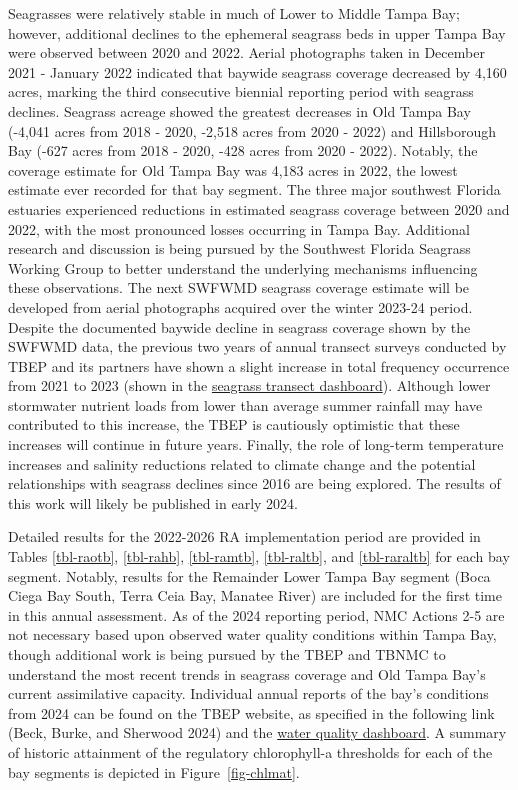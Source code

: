 \documentclass[
  letterpaper,
  DIV=11,
  numbers=noendperiod]{scrreport}
\begin{document}
Seagrasses were relatively stable in much of Lower to Middle Tampa Bay;
however, additional declines to the ephemeral seagrass beds in upper
Tampa Bay were observed between 2020 and 2022. Aerial photographs taken
in December 2021 - January 2022 indicated that baywide seagrass coverage
decreased by 4,160 acres, marking the third consecutive biennial
reporting period with seagrass declines. Seagrass acreage showed the
greatest decreases in Old Tampa Bay (-4,041 acres from 2018 - 2020,
-2,518 acres from 2020 - 2022) and Hillsborough Bay (-627 acres from
2018 - 2020, -428 acres from 2020 - 2022). Notably, the coverage
estimate for Old Tampa Bay was 4,183 acres in 2022, the lowest estimate
ever recorded for that bay segment. The three major southwest Florida
estuaries experienced reductions in estimated seagrass coverage between
2020 and 2022, with the most pronounced losses occurring in Tampa Bay.
Additional research and discussion is being pursued by the Southwest
Florida Seagrass Working Group to better understand the underlying
mechanisms influencing these observations. The next SWFWMD seagrass
coverage estimate will be developed from aerial photographs acquired
over the winter 2023-24 period. Despite the documented baywide decline
in seagrass coverage shown by the SWFWMD data, the previous two years of
annual transect surveys conducted by TBEP and its partners have shown a
slight increase in total frequency occurrence from 2021 to 2023 (shown
in the \href{https://shiny.tbep.org/seagrasstransect-dash}{seagrass
transect dashboard}). Although lower stormwater nutrient loads from
lower than average summer rainfall may have contributed to this
increase, the TBEP is cautiously optimistic that these increases will
continue in future years. Finally, the role of long-term temperature
increases and salinity reductions related to climate change and the
potential relationships with seagrass declines since 2016 are being
explored. The results of this work will likely be published in early
2024.

Detailed results for the 2022-2026 RA implementation period are provided
in Tables \ref{tbl-raotb}, \ref{tbl-rahb}, \ref{tbl-ramtb},
\ref{tbl-raltb}, and \ref{tbl-raraltb} for each bay segment. Notably,
results for the Remainder Lower Tampa Bay segment (Boca Ciega Bay South,
Terra Ceia Bay, Manatee River) are included for the first time in this
annual assessment. As of the 2024 reporting period, NMC Actions 2-5 are
not necessary based upon observed water quality conditions within Tampa
Bay, though additional work is being pursued by the TBEP and TBNMC to
understand the most recent trends in seagrass coverage and Old Tampa
Bay's current assimilative capacity. Individual annual reports of the
bay's conditions from 2024 can be found on the TBEP website, as
specified in the following link (Beck, Burke, and Sherwood 2024) and the
\href{https://shiny.tbep.org/wq-dash}{water quality dashboard}. A
summary of historic attainment of the regulatory chlorophyll-a
thresholds for each of the bay segments is depicted in
Figure~\ref{fig-chlmat}.
\end{document}
